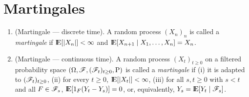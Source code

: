 \documentclass[a4paper,10pt]{scrbook}
\begin{document}
\section{Martingales}
\begin{enumerate}
 \item (Martingale --- discrete time). A random process $(X_n)_n$ is called a \textit{martingale} if 
		     $\E[|X_n|]<\infty$ and $\E[X_{n+1}{}\mid{}X_1,\ldots, X_n]=X_{n}$.
 \item (Martingale --- continuous time). A random process \((X_t)_{t\geq 0}\) on a filtered probability 
 space \((\Omega, \mathscr{F}, (\mathscr{F}_t)_{t\geq 0}, \mathrm{P})\) is called a \textit{martingale} if 
 (i) it is adapted to \((\mathscr{F}_t)_{t\geq 0}\), (ii) for every \(t\geq 0\), \(\E[|X_t|] < \infty\), 
 (iii) for all \(s, t\geq 0\) with \(s < t\) and all \(F \in \mathscr{F}_{s}\), \(\E[1_F (Y_t - Y_s)] = 0\), 
 or, equivalently, \(Y_s = \E[Y_t \mid \F_s]\).
 

\end{enumerate}
\end{document}
